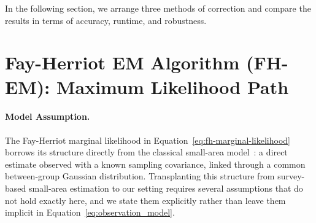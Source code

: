 In the following section, we arrange three methods of correction and compare the results in terms of accuracy, runtime, and robustness.

\section{Fay-Herriot EM Algorithm (FH-EM): Maximum Likelihood Path}
\label{sec:fay-herriot-em}

\paragraph*{Model Assumption.} The Fay-Herriot marginal likelihood in Equation~\eqref{eq:fh-marginal-likelihood} borrows its structure directly from the classical small-area model~\citep{Herriot1979, Pfeffermann2011}: a direct estimate observed with a known sampling covariance, linked through a common between-group Gaussian distribution. Transplanting this structure from survey-based small-area estimation to our setting requires several assumptions that do not hold exactly here, and we state them explicitly rather than leave them implicit in Equation~\eqref{eq:observation_model}.

